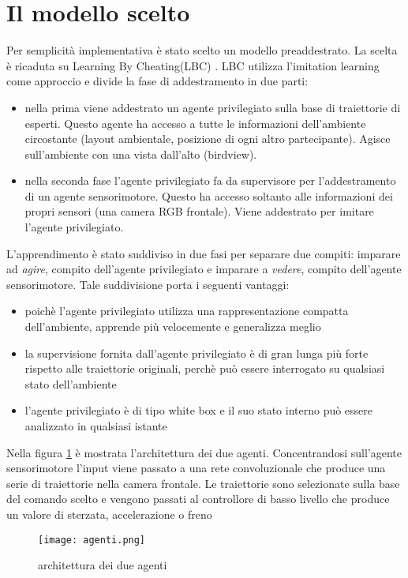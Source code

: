 \section{Il modello scelto}
Per semplicità implementativa è stato scelto un modello preaddestrato. La scelta è ricaduta su Learning By Cheating(LBC) \cite{lbc}. LBC utilizza l'imitation learning come
approccio e divide la fase di addestramento in due parti: \begin{itemize}
    \item nella prima viene addestrato un agente privilegiato sulla base di traiettorie di esperti. Questo agente ha accesso a tutte le informazioni 
    dell'ambiente circostante (layout ambientale, posizione di ogni altro partecipante). Agisce sull'ambiente con una vista dall'alto (birdview).
    \item nella seconda fase l'agente privilegiato fa da supervisore per l'addestramento di un agente sensorimotore. Questo ha accesso soltanto alle informazioni dei
    propri sensori (una camera RGB frontale). Viene addestrato per imitare l'agente privilegiato.
\end{itemize}
L'apprendimento è stato suddiviso in due fasi per separare due compiti: imparare ad \emph{agire}, compito dell'agente privilegiato e imparare a \emph{vedere}, compito dell'agente sensorimotore.
Tale suddivisione porta i seguenti vantaggi:\begin{itemize}
    \item poichè l'agente privilegiato utilizza una rappresentazione compatta dell'ambiente, apprende più velocemente e generalizza meglio
    \item la supervisione fornita dall'agente privilegiato è di gran lunga più forte rispetto alle traiettorie originali, perchè può essere interrogato 
    su qualsiasi stato dell'ambiente
    \item l'agente privilegiato è di tipo white box e il suo stato interno può essere analizzato in qualsiasi istante
\end{itemize}
Nella figura \ref{fig:arch} è mostrata l'architettura dei due agenti. Concentrandosi sull'agente sensorimotore  l'input viene passato a una rete convoluzionale che produce una serie di 
traiettorie nella camera frontale. Le traiettorie  sono selezionate sulla base del comando scelto e vengono passati al controllore di basso livello che produce un valore di sterzata, accelerazione o freno
\begin{figure}[h!]
    \texttt{[image: agenti.png]}
    \caption{architettura dei due agenti\cite{lbc}}
    \label{fig:arch}
\end{figure}
